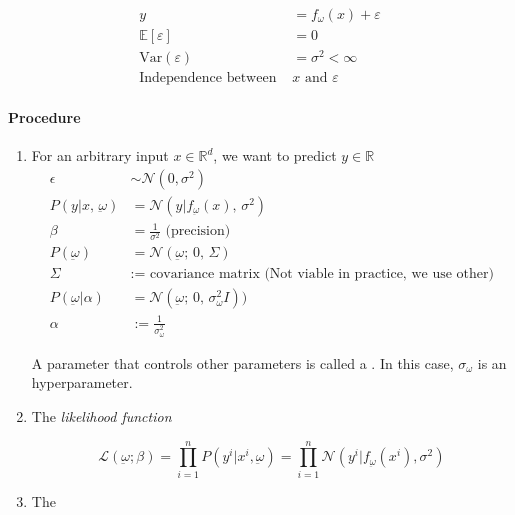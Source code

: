 \begin{align*}
  y &= f_\omega(x) + \varepsilon \\
  \mathds{E}[\varepsilon] &= 0 \\
  \text{Var}(\varepsilon) &= \sigma^2 < \infty \\
  \text{Independence between }& x \text{ and }\varepsilon
\end{align*}

\paragraph{Procedure}

\begin{enumerate}
	\item For an arbitrary input \(x \in \mathds{R}^d\), we want to predict
	      \(y \in \mathds{R}\)
	      \begin{align*}
		      \epsilon                      & \sim \mathcal{N}(0, \sigma^2)                                       \\
		      P(y | x,\, \underbar{\omega})   & = \mathcal{N}(y | f_{\underbar{\omega}}(x),\, \sigma^2)               \\
		      \beta                         & = \frac{1}{\sigma^2} \text{ (precision)}                            \\
		      P(\underbar{\omega})          & = \mathcal{N}(\underbar{\omega} ;\, 0 ,\, \Sigma)                       \\
		      \Sigma                        & := \text{ covariance matrix (Not viable in practice, we use other)} \\
		      P(\underbar{\omega} | \alpha) & = \mathcal{N}(\underbar{\omega} ;\, 0 ,\,\sigma_{\omega}^2 I))         \\
		      \alpha                        & := \frac{1}{\sigma_{\omega}^2}
	      \end{align*}

	      A parameter that controls other parameters is called a
	      . In this case, \(\sigma_\omega\) is an
	      hyperparameter.

	\item The \emph{likelihood function}

	      \[
		      \mathcal{L}(\underbar{\omega} ; \beta) = \prod_{i=1}^n P(y^i | x^i, \underbar{\omega}) =
		      \prod_{i=1}^n \mathcal{N}(y^i | f_{\underbar{\omega}}(x^i), \sigma^2)
	      \]

	\item The 
\end{enumerate}

